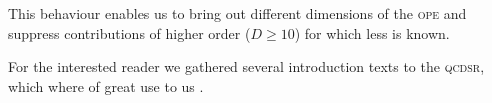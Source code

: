 \documentclass[../../index.tex]{subfiles}
\begin{document}
This behaviour enables us to bring out different dimensions of the \textsc{ope}
and suppress contributions of higher order (\(D\geq10\)) for which less is
known.


For the interested reader we gathered several introduction texts to the
\textsc{qcdsr}, which where of great use to us
\cite{Narison1989,Rafael1997,Colangelo2000,Dominguez2013}.
\end{document}
